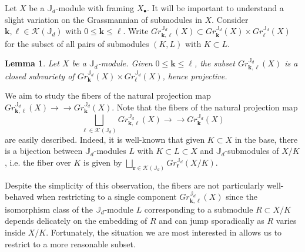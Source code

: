 \documentclass{amsart}
\numberwithin{equation}{section}
\newtheorem{lemma}[theorem]{Lemma}
\theoremstyle{definition}
\def\JJ{\mathbb{J}}
\def\bfk{\mathbf{k}}
\def\bfl{{\ensuremath{\boldsymbol\ell}}}
\def\bfr{\mathbf{r}}
\def\cK{\mathcal{K}}
\newcommand{\onto}{\to\!\!\!\!\!\to}
\begin{document}
Let $X$ be a $\JJ_d$-module with framing $X_\bullet$.  It will be important to understand a slight variation on the Grassmannian of submodules in $X$.  Consider $\bfk,\bfl\in\cK(\JJ_d)$ with $0\le\bfk\le\bfl$.  Write $Gr^{\JJ_d}_{\bfk,\bfl}(X)\subset Gr^{\JJ_d}_\bfk(X)\times Gr^{\JJ_d}_\bfl(X)$ for the subset of all pairs of submodules $(K,L)$ with $K\subset L$.  
\begin{lemma}
  Let $X$ be a $\JJ_d$-module.  Given $0\le\bfk\le\bfl$, the subset $Gr^{\JJ_d}_{\bfk,\bfl}(X)$ is a closed subvariety of $Gr^{\JJ_d}_\bfk(X)\times Gr^{\JJ_d}_\bfl(X)$, hence projective.
\end{lemma}

We aim to study the fibers of the natural projection map $Gr^{\JJ_d}_{\bfk,\bfl}(X)\onto Gr^{\JJ_d}_\bfk(X)$.  Note that the fibers of the natural projection map 
\[\bigsqcup_{\bfl\in\cK(\JJ_d)} Gr^{\JJ_d}_{\bfk,\bfl}(X)\onto Gr^{\JJ_d}_\bfk(X)\]
are easily described.  Indeed, it is well-known that given $K\subset X$ in the base, there is a bijection between $\JJ_d$-modules $L$ with $K\subset L\subset X$ and $\JJ_d$-submodules of $X/K$, i.e. the fiber over $K$ is given by $\bigsqcup\limits_{\bfr\in\cK(\JJ_d)} Gr^{\JJ_d}_\bfr(X/K)$.

Despite the simplicity of this observation, the fibers are not particularly well-behaved when restricting to a single component $Gr^{\JJ_d}_{\bfk,\bfl}(X)$ since the isomorphism class of the $\JJ_d$-module $L$ corresponding to a submodule $R\subset X/K$ depends delicately on the embedding of $R$ and can jump sporadically as $R$ varies inside $X/K$.  Fortunately, the situation we are most interested in allows us to restrict to a more reasonable subset.  
\end{document}
